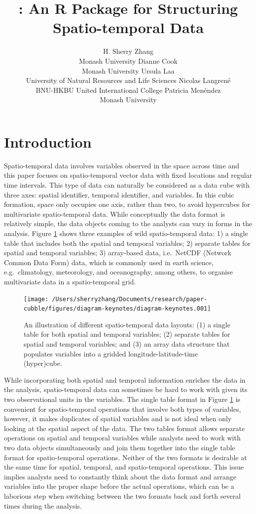 \documentclass[
]{jss}
\author{
H. Sherry Zhang\\Monash University \And Dianne Cook\\Monash University
\AND Ursula Laa\\University of Natural Resources and Life Sciences
\AND Nicolas Langrené\\BNU-HKBU United International College
\AND Patricia Menéndez\\Monash University \AND
}
\title{\pkg{cubble}: An R Package for Structuring Spatio-temporal Data}
\begin{document}
\newpage

\hypertarget{introduction}{%
\section{Introduction}\label{introduction}}

Spatio-temporal data involves variables observed in the space across
time and this paper focuses on spatio-temporal vector data with fixed
locations and regular time intervals. This type of data can naturally be
considered as a data cube with three axes: spatial identifier, temporal
identifier, and variables. In this cubic formation, space only occupies
one axis, rather than two, to avoid hypercubes for multivariate
spatio-temporal data. While conceptually the data format is relatively
simple, the data objects coming to the analysts can vary in forms in the
analysis. Figure \ref{fig:illu-input} shows three examples of wild
spatio-temporal data: 1) a single table that includes both the spatial
and temporal variables; 2) separate tables for spatial and temporal
variables; 3) array-based data, i.e.~NetCDF (Network Common Data Form)
data, which is commonly used in earth science, e.g.~climatology,
meteorology, and oceanography, among others, to organise multivariate
data in a spatio-temporal grid.

\begin{CodeChunk}
\begin{figure}

{\centering \texttt{[image: /Users/sherryzhang/Documents/research/paper-cubble/figures/diagram-keynotes/diagram-keynotes.001]} 

}

\caption[An illustration of different spatio-temporal data layouts]{An illustration of different spatio-temporal data layouts: (1) a single table for both spatial and temporal variables; (2) separate tables for spatial and temporal variables; and (3) an array data structure that populates variables into a gridded longitude-latitude-time (hyper)cube.}\label{fig:illu-input}
\end{figure}
\end{CodeChunk}

While incorporating both spatial and temporal information enriches the
data in the analysis, spatio-temporal data can sometimes be hard to work
with given its two observational units in the variables. The single
table format in Figure \ref{fig:illu-input} is convenient for
spatio-temporal operations that involve both types of variables,
however, it makes duplicates of spatial variables and is not ideal when
only looking at the spatial aspect of the data. The two tables format
allows separate operations on spatial and temporal variables while
analysts need to work with two data objects simultaneously and join them
together into the single table format for spatio-temporal operations.
Neither of the two formats is desirable at the same time for spatial,
temporal, and spatio-temporal operations. This issue implies analysts
need to constantly think about the data format and arrange variables
into the proper shape before the actual operations, which can be a
laborious step when switching between the two formats back and forth
several times during the analysis.
\end{document}

